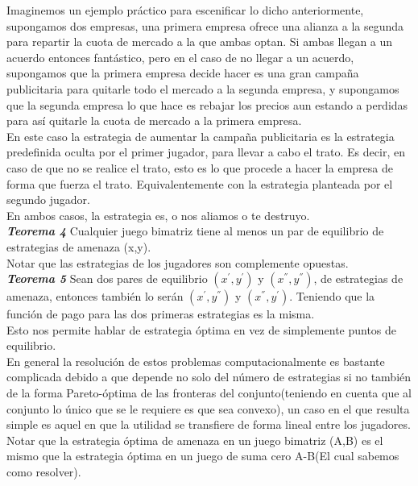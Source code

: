 \documentclass[10pt,a4paper]{book}
\begin{document}
Imaginemos un ejemplo práctico para escenificar lo dicho anteriormente, supongamos dos empresas, una primera empresa ofrece una alianza a la segunda para repartir la cuota de mercado a la que ambas optan. Si ambas llegan a un acuerdo entonces fantástico, pero en el caso de no llegar a un acuerdo, supongamos que la primera empresa decide hacer es una gran campaña publicitaria para quitarle todo el mercado a la segunda empresa, y supongamos que la segunda empresa lo que hace es rebajar los precios aun estando a perdidas para así quitarle la cuota de mercado a la primera empresa.\\
En este caso la estrategia de aumentar la campaña publicitaria es la estrategia predefinida oculta por el primer jugador, para llevar a cabo el trato. Es decir, en caso de que no se realice el trato, esto es lo que procede a hacer la empresa de forma que fuerza el trato. Equivalentemente con la estrategia planteada por el segundo jugador.\\

En ambos casos, la estrategia es, o nos aliamos o te destruyo.\\

\textit{\textbf{Teorema 4}} Cualquier juego bimatriz tiene al menos un par de equilibrio de estrategias de amenaza (x,y).\\

Notar que las estrategias de los jugadores son complemente opuestas.\\


\textit{\textbf{Teorema 5}} Sean dos pares de equilibrio $(x^{'},y^{'})$ y $(x^{''},y^{''})$, de estrategias de amenaza, entonces también lo serán $(x^{'},y^{''})$ y $(x^{''},y^{'})$. Teniendo que la función de pago para las dos primeras estrategias es la misma.\\

Esto nos permite hablar de estrategia óptima en vez de simplemente puntos de equilibrio.\\

En general la resolución de estos problemas computacionalmente es bastante complicada debido a que depende no solo del número de estrategias si no también de la forma Pareto-óptima de las fronteras del conjunto(teniendo en cuenta que al conjunto lo único que se le requiere es que sea convexo), un caso en el que resulta simple es aquel en que la utilidad se transfiere de forma lineal entre los jugadores.\\

Notar que la estrategia óptima de amenaza en un juego bimatriz (A,B) es el mismo que la estrategia óptima en un juego de suma cero A-B(El cual sabemos como resolver).\\
 
\end{document}
